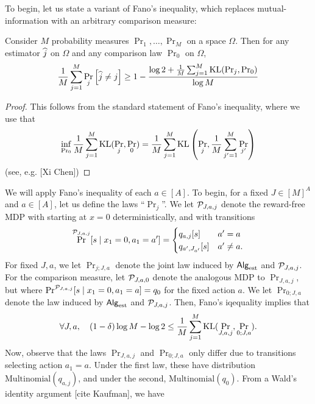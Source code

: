 To begin, let us state a variant of Fano's inequality, which replaces mutual-information with an arbitrary comparison measure:
\begin{lemma} Consider $M$ probability measures $\Pr_{1},\dots,\Pr_{M}$ on a space $\Omega$. Then for any estimator $\widehat{j}$ on $\Omega$ and any comparison law $\Pr_0$ on $\Omega$, 
\begin{align*}
\frac{1}{M}\sum_{j=1}^M \Pr_{j}\left[\widehat{j} \ne j\right] \ge 1 - \frac{\log 2 + \frac{1}{M}\sum_{j=1}^M\mathrm{KL}(\Pr_j,\Pr_0) }{\log M}
\end{align*}
\end{lemma}
\begin{proof} This follows from the standard statement of Fano's inequality, where we use that 
\begin{align*}
\inf_{\Pr_0}\frac{1}{M}\sum_{j=1}^M\mathrm{KL}(\Pr_j,\Pr_0) =  \frac{1}{M}\sum_{j=1}^M\mathrm{KL}\left(\Pr_j,\frac{1}{M}\sum_{j'=1}^M\Pr_{j'}\right) 
\end{align*}
(see, e.g. [Xi Chen])
\end{proof}
We will apply Fano's inequality of each $a \in [A]$. To begin, for a fixed $J \in [M]^A$ and $a \in [A]$, let us define the laws ``$\Pr_{j}$''. We let $\mathcal{P}_{J,a,j}$ denote the reward-free MDP with starting at $x = 0$ deterministically, and with transitions
\begin{align*}
\Pr^{\mathcal{P}_{J,a,j}}[s \mid x_1 = 0,a_1 = a'] = \begin{cases} q_{a,j}[s] & a' = a\\
q_{a',J_{a'}}[s] & a' \ne a.
\end{cases}
\end{align*}
For fixed $J,a$, we let $\Pr_{j;J,a}$ denote the joint law induced by $\mathsf{Alg}_{\mathrm{est}}$ and $\mathcal{P}_{J,a,j}$. For the comparison measure, let $\mathcal{P}_{J,a,0}$ denote the analogous MDP to $\Pr_{J,a,j}$, but where $\Pr^{\mathcal{P}_{J,a,j}}[s \mid x_1 = 0,a_1 = a] = q_{0}$ for the fixed action $a$. We let $\Pr_{0;J,a}$ denote the law induced by $\mathsf{Alg}_{\mathrm{est}}$ and $\mathcal{P}_{J,a,j}$. Then, Fano's iqequality implies that 
\begin{align}\label{eq:Fano_conclusion}
\forall J,a, \quad (1 - \delta)\log M - \log 2 \le  \frac{1}{M}\sum_{j=1}^M \mathrm{KL}(\Pr_{J,a,j},\Pr_{0;J,a}). 
\end{align}
Now, observe that the laws $\Pr_{J,a,j}$ and $\Pr_{0;J,a}$ only differ due to transitions selecting action $a_1 = a$. Under the first law, these have distribution $\mathrm{Multinomial}(q_{a,j})$, and under the second, $\mathrm{Multinomial}(q_{0})$.  From a Wald's identity argument [cite Kaufman], we have
